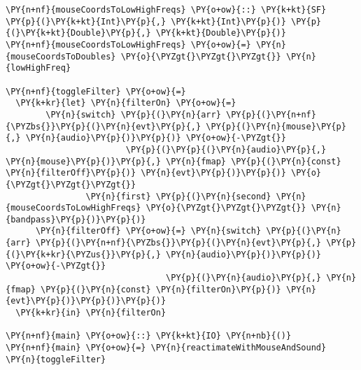 \documentclass{article}
\begin{document}
\begin{Verbatim}[commandchars=\\\{\}]
\PY{n+nf}{mouseCoordsToLowHighFreqs} \PY{o+ow}{::} \PY{k+kt}{SF} \PY{p}{(}\PY{k+kt}{Int}\PY{p}{,} \PY{k+kt}{Int}\PY{p}{)} \PY{p}{(}\PY{k+kt}{Double}\PY{p}{,} \PY{k+kt}{Double}\PY{p}{)} 
\PY{n+nf}{mouseCoordsToLowHighFreqs} \PY{o+ow}{=} \PY{n}{mouseCoordsToDoubles} \PY{o}{\PYZgt{}\PYZgt{}\PYZgt{}} \PY{n}{lowHighFreq}

\PY{n+nf}{toggleFilter} \PY{o+ow}{=} 
  \PY{k+kr}{let} \PY{n}{filterOn} \PY{o+ow}{=} 
        \PY{n}{switch} \PY{p}{(}\PY{n}{arr} \PY{p}{(}\PY{n+nf}{\PYZbs{}}\PY{p}{(}\PY{n}{evt}\PY{p}{,} \PY{p}{(}\PY{n}{mouse}\PY{p}{,} \PY{n}{audio}\PY{p}{)}\PY{p}{)} \PY{o+ow}{-\PYZgt{}} 
                        \PY{p}{(}\PY{p}{(}\PY{n}{audio}\PY{p}{,} \PY{n}{mouse}\PY{p}{)}\PY{p}{,} \PY{n}{fmap} \PY{p}{(}\PY{n}{const} \PY{n}{filterOff}\PY{p}{)} \PY{n}{evt}\PY{p}{)}\PY{p}{)} \PY{o}{\PYZgt{}\PYZgt{}\PYZgt{}}
                \PY{n}{first} \PY{p}{(}\PY{n}{second} \PY{n}{mouseCoordsToLowHighFreqs} \PY{o}{\PYZgt{}\PYZgt{}\PYZgt{}} \PY{n}{bandpass}\PY{p}{)}\PY{p}{)}
      \PY{n}{filterOff} \PY{o+ow}{=} \PY{n}{switch} \PY{p}{(}\PY{n}{arr} \PY{p}{(}\PY{n+nf}{\PYZbs{}}\PY{p}{(}\PY{n}{evt}\PY{p}{,} \PY{p}{(}\PY{k+kr}{\PYZus{}}\PY{p}{,} \PY{n}{audio}\PY{p}{)}\PY{p}{)} \PY{o+ow}{-\PYZgt{}}
                                \PY{p}{(}\PY{n}{audio}\PY{p}{,} \PY{n}{fmap} \PY{p}{(}\PY{n}{const} \PY{n}{filterOn}\PY{p}{)} \PY{n}{evt}\PY{p}{)}\PY{p}{)}\PY{p}{)}
  \PY{k+kr}{in} \PY{n}{filterOn}

\PY{n+nf}{main} \PY{o+ow}{::} \PY{k+kt}{IO} \PY{n+nb}{()}
\PY{n+nf}{main} \PY{o+ow}{=} \PY{n}{reactimateWithMouseAndSound} \PY{n}{toggleFilter}
\end{Verbatim}
\end{document}
